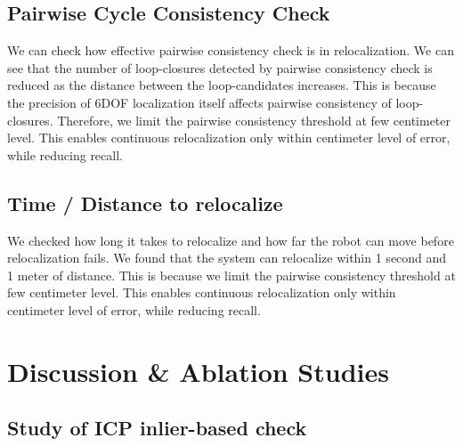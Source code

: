 \subsection*{Pairwise Cycle Consistency Check}
We can check how effective pairwise consistency check is in relocalization. We can see that the number of loop-closures detected by pairwise consistency check is reduced as the distance between the loop-candidates increases. This is because the precision of 6DOF localization itself affects pairwise consistency of loop-closures. Therefore, we limit the pairwise consistency threshold at few centimeter level. This enables continuous relocalization only within centimeter level of error, while reducing recall. 

\subsection*{Time / Distance to relocalize}
We checked how long it takes to relocalize and how far the robot can move before relocalization fails. We found that the system can relocalize within 1 second and 1 meter of distance. This is because we limit the pairwise consistency threshold at few centimeter level. This enables continuous relocalization only within centimeter level of error, while reducing recall.

\section{Discussion \& Ablation Studies}


\subsection*{Study of ICP inlier-based check}
\label{sec:exp_icp_ablation}

